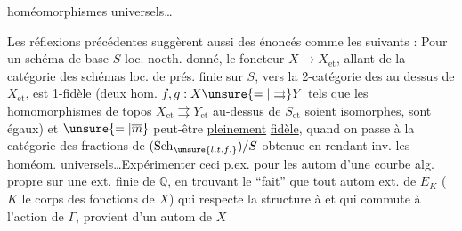 homéomorphismes universels\ldots

Les réflexions précédentes suggèrent aussi des énoncés comme les suivants : Pour un schéma de base $S$ loc. noeth. donné, le foncteur $X\longrightarrow X_{\mathrm{et}}$, allant de la catégorie  des schémas loc. de prés. finie sur $S$, vers la 2-catégorie des  au dessus de $X_{\mathrm{et}}$, est  1-fidèle (deux hom. $f,g:X\unsure{=|\rightrightarrows}Y$ tels que les homomorphismes de topos $X_{\mathrm{et}}\rightrightarrows Y_{\mathrm{et}}$ au-dessus de $S_{\mathrm{et}}$ soient  isomorphes, sont égaux) et $\unsure{=|\overline m}$ peut-être \uline{pleinement} \uline{fidèle}, quand on passe à la catégorie des fractions de $(\mathrm{Sch}_{\unsure{l.t.f.}})/S$ obtenue en rendant inv. les homéom. universels\ldots Expérimenter  ceci p.ex. pour les autom d'une courbe alg. propre sur une ext. finie de $\mathbb{Q}$, en trouvant le ``fait'' que tout autom ext. de $E_K$ ($K$ le corps des fonctions de $X$) qui respecte la structure à  et qui commute à l'action de $\Gamma$, provient d'un autom de $X$
